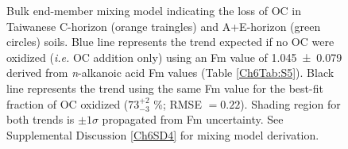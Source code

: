 \begin{figure}[t]
	\caption[Bulk $\Delta$\%OC vs. Fm mixing plot]{Bulk end-member mixing model indicating the loss of OC in Taiwanese C-horizon (orange traingles) and A+E-horizon (green circles) soils. Blue line represents the trend expected if no OC were oxidized (\textit{i.e.} OC addition only) using an Fm value of \num{1.045 \pm 0.079} derived from \textit{n}-alkanoic acid Fm values (Table \ref{Ch6Tab:S5}). Black line represents the trend using the same Fm value for the best-fit fraction of OC oxidized ($73^{+2}_{-3}$ \%; RMSE $= 0.22$). Shading region for both trends is $\pm 1\sigma$ propagated from Fm uncertainty. See Supplemental Discussion \ref{Ch6SD4} for mixing model derivation.}
	\label{Ch6Fig:1} 
\end{figure}

